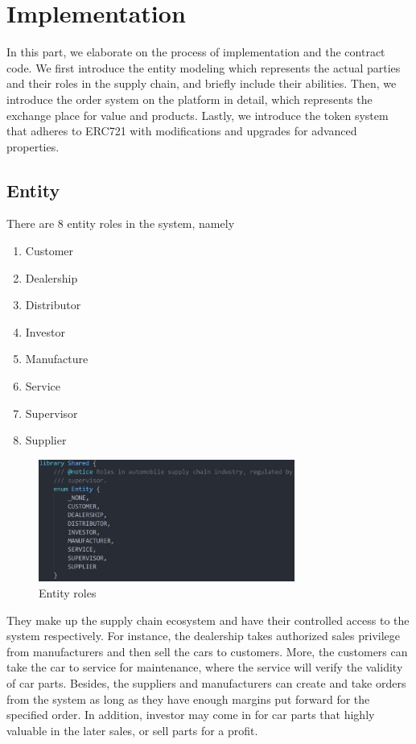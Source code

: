 \documentclass[12pt]{article}
\begin{document}
%

\section{Implementation}
In this part, we elaborate on the process of implementation and the contract code. We first introduce the entity modeling which represents the actual parties and their roles in the supply chain, and briefly include their abilities. Then, we introduce the order system on the platform in detail, which represents the exchange place for value and products. Lastly, we introduce the token system that adheres to ERC721 with modifications and upgrades for advanced properties.

\subsection{Entity}
There are 8 entity roles in the system, namely
\begin{enumerate}[label=\alph*.]
    \item Customer
    \item Dealership
    \item Distributor
    \item Investor
    \item Manufacture
    \item Service
    \item Supervisor
    \item Supplier
\end{enumerate}
\begin{figure}[h]
    \centering
    \includegraphics[width=0.75\textwidth]{entities.jpg}
    \caption{Entity roles}
    \label{fig:entity}
\end{figure}
They make up the supply chain ecosystem and have their controlled access to the system respectively. For instance, the dealership takes authorized sales privilege from manufacturers and then sell the cars to customers. More, the customers can take the car to service for maintenance, where the service will verify the validity of car parts. Besides, the suppliers and manufacturers can create and take orders from the system as long as they have enough margins put forward for the specified order. In addition, investor may come in for car parts that highly valuable in the later sales, or sell parts for a profit.
\end{document}
